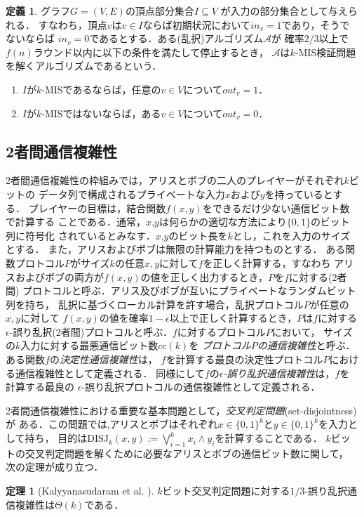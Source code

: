 \documentclass[11pt,a4paper]{jarticle}
\newcommand{\Inp}{\mathit{in}}
\newcommand{\Out}{\mathit{out}}
\theoremstyle{definition}
\newtheorem{theorem}{定理}[section]
\newtheorem{definition}{定義}[section]
\begin{document}
\begin{definition}
グラフ$G=(V,E)$の頂点部分集合$I \subseteq V$ が入力の部分集合として与えられる．
すなわち，頂点$v$は$v\in I$ならば初期状況において$\Inp_v = 1$であり，そうでないならば
$\Inp_v = 0$であるとする．ある(乱択)アルゴリズム$\mathcal{A}$が
確率$2/3$以上で$f(n)$ラウンド以内に以下の条件を満たして停止するとき，
$\mathcal{A}$は$k$-MIS検証問題を解くアルゴリズムであるという．
\begin{enumerate}
\item $I$が$k$-MISであるならば，任意の$v \in V$について$\Out_v = 1$．
\item $I$が$k$-MISではないならば，ある$v \in V$について$\Out_v = 0$．
\end{enumerate}
\end{definition}

\subsection{2者間通信複雑性}
2者間通信複雑性の枠組みでは，アリスとボブの二人のプレイヤーがそれぞれ$k$ビットの
データ列で構成されるプライベートな入力$x$および$y$を持っているとする．
プレイヤーの目標は，結合関数$f(x,y)$をできるだけ少ない通信ビット数で計算する
ことである．通常，$x$,$y$は何らかの適切な方法により$\{0,1\}$のビット列に符号化
されているとみなす．$x$,$y$のビット長を$k$とし，これを入力のサイズとする．
また，アリスおよびボブは無限の計算能力を持つものとする．
ある関数プロトコル$P$がサイズ$k$の任意$x, y$に対して$f$を正しく計算する，すなわち
アリスおよびボブの両方が$f(x,y)$の値を正しく出力するとき，$P$を$f$に対する(2者間)
プロトコルと呼ぶ．アリス及びボブが互いにプライベートなランダムビット列を持ち，
乱択に基づくローカル計算を許す場合，乱択プロトコル$P$が任意の$x, y$に対して
$f(x,y)$の値を確率$1-\epsilon$以上で正しく計算するとき，$P$は$f$に対する
$\epsilon$-誤り乱択(2者間)プロトコルと呼ぶ．$f$に対するプロトコル$P$において，
サイズの$k$入力に対する最悪通信ビット数$\mathit{cc}(k)$を
\emph{プロトコル$P$の通信複雑性}と呼ぶ．ある関数$f$の\emph{決定性通信複雑性}は，
$f$を計算する最良の決定性プロトコル$P$における通信複雑性として定義される．
同様にして$f$の\emph{$\epsilon$-誤り乱択通信複雑性}は，$f$を計算する最良の
$\epsilon$-誤り乱択プロトコルの通信複雑性として定義される．

2者間通信複雑性における重要な基本問題として，\emph{交叉判定問題}(set-disjointness)が
ある．この問題では,アリスとボブはそれぞれ$x \in \{0, 1\}^{k}$と$y \in \{0, 1\}^{k}$を入力として持ち，
目的は$\mathrm{DISJ}_{k} (x, y) :=\bigvee_{i = 1}^{k} x_{i} \land y_{i}$を計算することである．
$k$ビットの交叉判定問題を解くために必要なアリスとボブの通信ビット数に関して，
次の定理が成り立つ．
\begin{theorem}[Kalyyanasudaram et al. \cite{kalyanasundaram1992probabilistic}] \label{thm:disjointness}
$k$ビット交叉判定問題に対する$1/3$-誤り乱択通信複雑性は$\Theta(k)$である．
\end{theorem}
\end{document}
